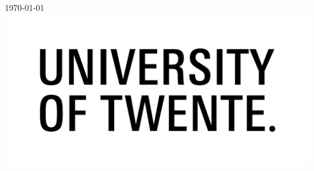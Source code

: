 \begin{titlepage}

{\large \today}\\[2cm] %


\includegraphics{img/UT_logo.png}\\ %
 

\vfill %

\end{titlepage}
